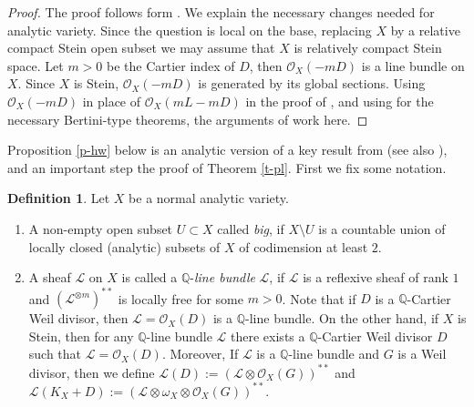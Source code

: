\documentclass[12pt]{amsart}
\theoremstyle{plain}
\theoremstyle{remark}
\theoremstyle{definition}
\newcommand{\<}{\leq}
\def\mcO{\mathcal{O}}
\newcommand{\OO}{{\mathcal{O}}}
\newcommand{\Q}{{\mathbb{Q}}}
\def\mcO{\mathcal{O}}
\def\mcL{\mathcal{L}}
\theoremstyle{definition}
\newtheorem{definition}[theorem]{Definition}
\theoremstyle{definition}
\numberwithin{equation}{section}
\theoremstyle{remark}
\begin{document}
\begin{proof}
    The proof follows form \cite[Corollary 5.25]{KM98}. We explain the necessary changes needed for analytic variety. Since the question is local on the base, replacing $X$ by a relative compact Stein open  subset we may assume that $X$ is relatively compact Stein space. Let $m>0$ be the Cartier index of $D$, then $\mcO_X(-mD)$ is a line bundle on $X$. Since $X$ is Stein, $\mcO_X(-mD)$ is generated by its global sections. Using $\mcO_X(-mD)$ in place of $\mcO_X(mL-mD)$ in the proof of \cite[Corollary 5.25]{KM98}, and using \cite[Theorem 2.21]{DHP22} for the necessary Bertini-type theorems, the arguments of \cite[Corollary 5.25]{KM98} work here.  
    
    
\end{proof}





Proposition \ref{p-hw} below is an analytic version of a key result from \cite{HW19} (see also \cite{BK23}), and an important step the proof of Theorem \ref{t-pl}. First we  fix some notation.

\begin{definition}\label{def:Q-line-bundle}
Let $X$ be a normal analytic variety.
    \begin{enumerate}
   
    \item A non-empty open subset $U\subset X$ called \emph{big}, if $X\setminus U$ is a countable union of locally closed (analytic) subsets of $X$ of codimension at least $2$.

    \item A sheaf $\mcL$ on $X$  is called a $\Q$-{\emph {line bundle}} $\mathcal L$, if $\mathcal L$ is a reflexive sheaf of rank $1$ and $(\mathcal L^{\otimes m})^{**}$ is locally free for some $m>0$. 
Note that if $D$ is a $\Q$-Cartier Weil divisor, then $\mathcal L=\OO _X(D)$ is a $\Q$-line bundle. On the other hand, if $X$ is Stein, then for any $\Q$-line bundle $\mathcal L$ there exists a $\Q$-Cartier Weil divisor $D$ such that $\mathcal L=\OO _X(D)$. Moreover, 
If $\mathcal L$ is a $\Q$-line bundle and $G$ is a Weil divisor, then we define  $\mathcal L(D):=(\mathcal L \otimes \OO _X(G))^{**}$ and $\mathcal L(K_X+D):=(\mathcal L \otimes \omega _X\otimes \OO _X(G))^{**}$.
    \end{enumerate}  
\end{definition}
\end{document}
